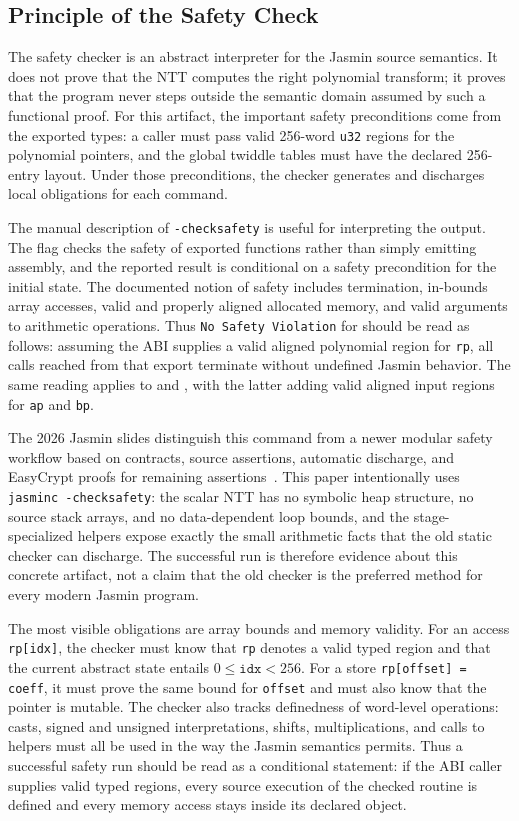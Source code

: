 \documentclass[10pt,twocolumn]{article}
\newcommand{\jasmin}{Jasmin}
\begin{document}
\subsection{Principle of the Safety Check}

The safety checker is an abstract interpreter for the \jasmin{} source
semantics.  It does not prove that the NTT computes the right polynomial
transform; it proves that the program never steps outside the semantic domain
assumed by such a functional proof.  For this artifact, the important safety
preconditions come from the exported types: a caller must pass valid 256-word
\texttt{u32} regions for the polynomial pointers, and the global twiddle tables
must have the declared 256-entry layout.  Under those preconditions, the checker
generates and discharges local obligations for each command.

The manual description of \texttt{-checksafety} is useful for interpreting the
output.  The flag checks the safety of exported functions rather than simply
emitting assembly, and the reported result is conditional on a safety
precondition for the initial state.  The documented notion of safety includes
termination, in-bounds array accesses, valid and properly aligned allocated
memory, and valid arguments to arithmetic operations.  Thus
\texttt{No Safety Violation} for  should be read as follows:
assuming the ABI supplies a valid aligned polynomial region for \texttt{rp}, all
calls reached from that export terminate without undefined \jasmin{} behavior.
The same reading applies to  and
, with the latter adding valid aligned input regions
for \texttt{ap} and \texttt{bp}.

The 2026 \jasmin{} slides distinguish this command from a newer modular safety
workflow based on contracts, source assertions, automatic discharge, and
EasyCrypt proofs for remaining assertions~\cite{JasminFramework2026}.  This
paper intentionally uses \texttt{jasminc -checksafety}: the scalar NTT has no
symbolic heap structure, no source stack arrays, and no data-dependent loop
bounds, and the stage-specialized helpers expose exactly the small arithmetic
facts that the old static checker can discharge.  The successful run is
therefore evidence about this concrete artifact, not a claim that the old
checker is the preferred method for every modern \jasmin{} program.

The most visible obligations are array bounds and memory validity.  For an
access \texttt{rp[idx]}, the checker must know that \texttt{rp} denotes a valid
typed region and that the current abstract state entails
\(0 \leq \texttt{idx} < 256\).  For a store \texttt{rp[offset] = coeff}, it must
prove the same bound for \texttt{offset} and must also know that the pointer is
mutable.  The checker also tracks definedness of word-level operations: casts,
signed and unsigned interpretations, shifts, multiplications, and calls to
helpers must all be used in the way the \jasmin{} semantics permits.  Thus a
successful safety run should be read as a conditional statement: if the ABI
caller supplies valid typed regions, every source execution of the checked
routine is defined and every memory access stays inside its declared object.
\end{document}
